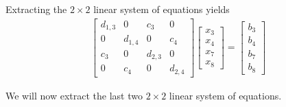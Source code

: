 \documentclass{article}
\begin{document}
Extracting the $2 \times 2$ linear system of equations yields
\begin{align*}
     \begin{bmatrix}
         d_{1,3} & 0  & c_{3} & 0\\
        0 & d_{1,4} & 0 & c_{4} \\
        c_{3} & 0 & d_{2,3} & 0 \\
        0 &c_{4} &  0 & d_{2,4}
    \end{bmatrix}\begin{bmatrix}
         x_{3} \\ x_{4} \\ x_{7} \\ x_{8}
    \end{bmatrix} = \begin{bmatrix}
        b_{3} \\ b_{4}  \\ b_{7} \\ b_{8}
    \end{bmatrix}
\end{align*}

\pagebreak

\noindent We will now extract the last two $2 \times 2$ linear system of equations.
\end{document}
